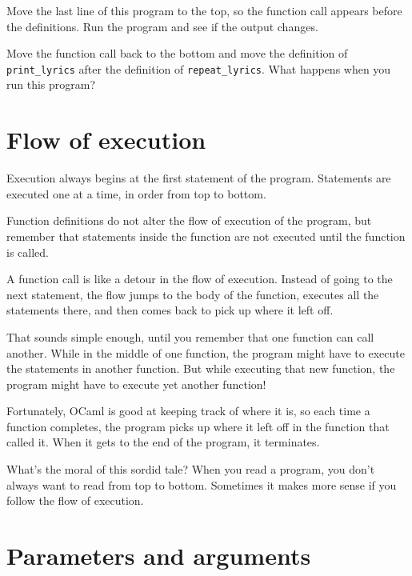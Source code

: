 \documentclass[10pt]{book}
\begin{document}
\begin{ex}
Move the last line of this program
to the top, so the function call appears before the definitions. Run 
the program and see if the output changes.
\end{ex}

\begin{ex}
Move the function call back to the bottom
and move the definition of \verb"print_lyrics" after the definition of
\verb"repeat_lyrics".  What happens when you run this program?
\end{ex}


\section{Flow of execution}

Execution always begins at the first statement of the program.
Statements are executed one at a time, in order from top to bottom.

Function definitions do not alter the flow of execution of the
program, but remember that statements inside the function are not
executed until the function is called.

A function call is like a detour in the flow of execution. Instead of
going to the next statement, the flow jumps to the body of
the function, executes all the statements there, and then comes back
to pick up where it left off.

That sounds simple enough, until you remember that one function can
call another.  While in the middle of one function, the program might
have to execute the statements in another function. But while
executing that new function, the program might have to execute yet
another function!

Fortunately, OCaml is good at keeping track of where it is, so each
time a function completes, the program picks up where it left off in
the function that called it.  When it gets to the end of the program,
it terminates.

What's the moral of this sordid tale?  When you read a program, you
don't always want to read from top to bottom.  Sometimes it makes
more sense if you follow the flow of execution.


\section{Parameters and arguments}
\label{parameters}
\end{document}
